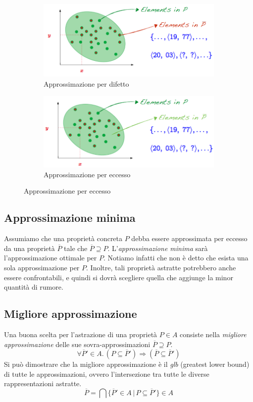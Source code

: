\documentclass[a4paper,oneside,titlepage]{book}
\begin{document}
\begin{figure}[htp]
	\begin{subfigure}{0.49\textwidth}
	    \centering
		\includegraphics[width=\textwidth, height=\textheight, keepaspectratio]{below.png}
		\caption{Approssimazione per difetto}
	\end{subfigure}
	\hfill
	\begin{subfigure}{0.49\textwidth}
	    \centering
		\includegraphics[width=\textwidth, height=\textheight, keepaspectratio]{above.png} 
		\caption{Approssimazione per eccesso}
	\end{subfigure}
\end{figure}

\subsection{Approssimazione minima}
Assumiamo che una proprietà concreta $P$ debba essere approssimata per eccesso da una proprietà $\overline{P}$ tale che $\overline{P} \supseteq P$. L'\textit{approssimazione minima} sarà l'approssimazione ottimale per $P$. Notiamo infatti che non è detto che esista una sola approssimazione per $P$. Inoltre, tali proprietà astratte potrebbero anche essere confrontabili, e quindi si dovrà scegliere quella che aggiunge la minor quantità di rumore.

\subsection{Migliore approssimazione}
Una buona scelta per l'astrazione di una proprietà $P \in A$ consiste nella \textit{migliore approssimazione} delle sue sovra-approssimazioni $\overline{P} \supseteq P$.
\[
    \forall \overline{P}' \in A. \, (P \subseteq \overline{P}') \Rightarrow (\overline{P} \subseteq \overline{P}')
\]
Si può dimostrare che la migliore approssimazione è il \textit{glb} (greatest lower bound) di tutte le approssimazioni, ovvero l'intersezione tra tutte le diverse rappresentazioni astratte.
\[
    \overline{P} = \bigcap \{ \overline{P}' \in A \, | \, P \subseteq \overline{P}' \} \in A
\]
\end{document}
